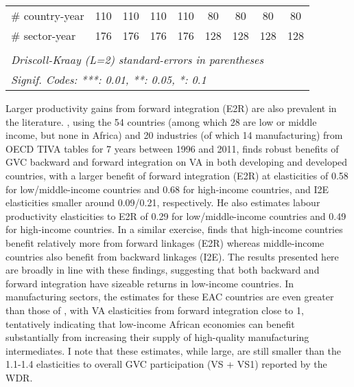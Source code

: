 \documentclass[a4paper]{article}
\begin{document}
\begin{table}[h!]
{\begin{tabular}{lcccccccc}
      \# country-year         & 110                & 110                   & 110                    & 110                   & 80                 & 80                    & 80                     & 80\\  
      \# sector-year          & 176                & 176                   & 176                    & 176                   & 128                & 128                   & 128                    & 128\\ 
      \bottomrule \\ [-0.9em]
      \multicolumn{9}{l}{\emph{Driscoll-Kraay (L=2) standard-errors in parentheses}}\\
      \multicolumn{9}{l}{\emph{Signif. Codes: ***: 0.01, **: 0.05, *: 0.1}}\\
   \end{tabular}
   }
\end{table}
\FloatBarrier



Larger productivity gains from forward integration (E2R) are also prevalent in the literature. \citet{Kummritz20161}, using the 54 countries (among which 28 are low or middle income, but none in Africa) and 20 industries (of which 14 manufacturing) from OECD TIVA tables for 7 years between 1996 and 2011, finds robust benefits of GVC backward and forward integration on VA in both developing and developed countries, with a larger benefit of forward integration (E2R) at elasticities of 0.58 for low/middle-income countries and 0.68 for high-income countries, and I2E elasticities smaller around 0.09/0.21, respectively. He also estimates labour productivity elasticities to E2R of 0.29 for low/middle-income countries and 0.49 for high-income countries. In a similar exercise, \citet{kummritz2015global} finds that high-income countries benefit relatively more from forward linkages (E2R) whereas middle-income countries also benefit from backward linkages (I2E). The results presented here are broadly in line with these findings, suggesting that both backward and forward integration have sizeable returns in low-income countries. In manufacturing sectors, the estimates for these EAC countries are even greater than those of \citet{Kummritz20161}, with VA elasticities from forward integration close to 1, tentatively indicating that low-income African economies can benefit substantially from increasing their supply of high-quality manufacturing intermediates. I note that these estimates, while large, are still smaller than the 1.1-1.4 elasticities to overall GVC participation (VS + VS1) reported by the WDR. \newline
 
\end{document}
